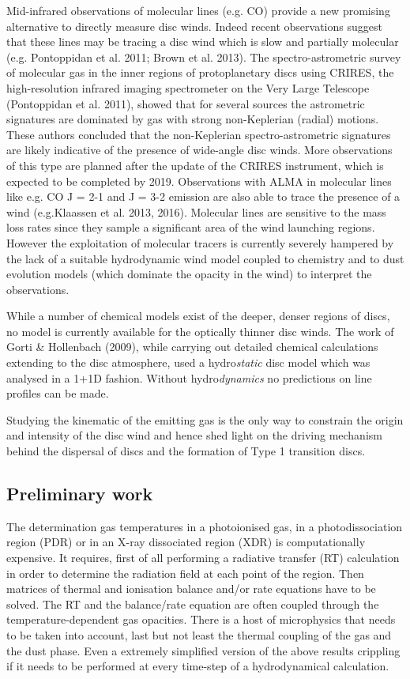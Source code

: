 \documentclass[10pt,fleqn,twoside]{article}
\begin{document}
Mid-infrared observations of molecular lines (e.g. CO) provide a new
promising alternative to directly measure disc winds. Indeed recent
observations suggest that these lines may be tracing a disc wind which
is slow and partially molecular (e.g. Pontoppidan et al. 2011; Brown et al. 2013). 
The spectro-astrometric survey of molecular gas in the inner regions of
protoplanetary discs using CRIRES, the high-resolution infrared
imaging spectrometer on the Very Large Telescope (Pontoppidan et
al. 2011), showed that for several sources the astrometric signatures
are dominated by gas with strong non-Keplerian (radial) motions. These
authors concluded that the non-Keplerian spectro-astrometric
signatures are likely indicative of the presence of wide-angle disc
winds. 
More observations of this type are planned after the update of
the CRIRES instrument, which is expected to be completed by
2019. Observations with ALMA in molecular lines like e.g. CO J = 2-1
and J = 3-2 emission are also able to trace the presence of a wind (e.g.Klaassen et al. 2013, 2016).  
Molecular lines are sensitive to the mass loss rates since they
sample a significant area of the wind launching regions. However the
exploitation of molecular tracers is currently severely hampered by
the lack of a suitable hydrodynamic wind model coupled to chemistry
and to dust evolution models (which dominate the opacity in the wind)
to interpret the observations.

 While a number of chemical models exist
of the deeper, denser regions of discs, no model is currently
available for the optically thinner disc winds. The work of Gorti \&
Hollenbach (2009), while carrying out detailed chemical calculations
extending to the disc atmosphere, used a hydro{\it static} disc model which
was analysed in a 1+1D fashion. Without hydro{\it dynamics} no predictions
on line profiles can be made.  

Studying the kinematic of the emitting gas is the only way to
constrain the origin and intensity of the disc wind and hence shed
light on the driving mechanism behind the dispersal of discs and the
formation of Type 1 transition discs. 

\subsection{Preliminary work}

The determination gas temperatures in a photoionised gas, in a
photodissociation region (PDR) or in an X-ray dissociated region (XDR)
is computationally expensive. It requires, first of all 
performing a radiative transfer (RT) calculation in order to determine the
radiation field at each point of the region. Then matrices of thermal and
ionisation balance and/or rate equations have to be solved. The RT and
the balance/rate equation are often coupled through the
temperature-dependent gas opacities. There is a host of microphysics
that needs to be taken into account, last but not least the thermal
coupling of the gas and the dust phase. Even a extremely simplified
version of the above results crippling if it needs to be performed at
every time-step of a hydrodynamical calculation. 
\end{document}
